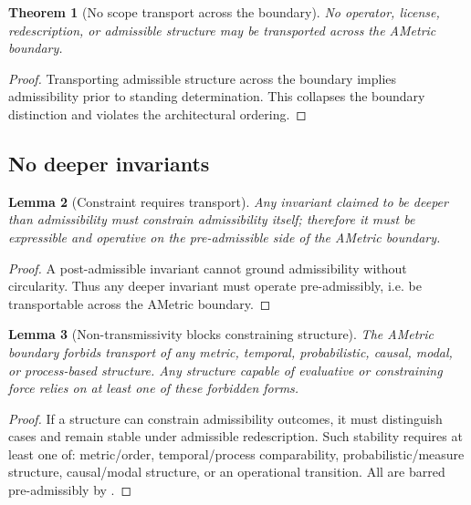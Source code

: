 \documentclass[11pt]{article}
\newtheorem{theorem}{Theorem}[section]
\newtheorem{lemma}[theorem]{Lemma}
\theoremstyle{definition}
\begin{document}
\begin{theorem}[No scope transport across the boundary]
\label{thm:no-scope-transport-boundary}
No operator, license, redescription, or admissible structure may be transported across the AMetric boundary.
\end{theorem}

\begin{proof}
Transporting admissible structure across the boundary implies admissibility prior to standing determination.
This collapses the boundary distinction and violates the architectural ordering.
\end{proof}

\subsection{No deeper invariants}

\begin{lemma}[Constraint requires transport]
\label{lem:constraint-requires-transport}
Any invariant claimed to be \emph{deeper than admissibility} must constrain admissibility itself; therefore it must be expressible and operative on the pre-admissible side of the AMetric boundary.
\end{lemma}

\begin{proof}
A post-admissible invariant cannot ground admissibility without circularity.
Thus any deeper invariant must operate pre-admissibly, i.e. be transportable across the AMetric boundary.
\end{proof}

\begin{lemma}[Non-transmissivity blocks constraining structure]
\label{lem:nontrans-blocks}
The AMetric boundary forbids transport of any metric, temporal, probabilistic, causal, modal, or process-based structure.
Any structure capable of evaluative or constraining force relies on at least one of these forbidden forms.
\end{lemma}

\begin{proof}
If a structure can constrain admissibility outcomes, it must distinguish cases and remain stable under admissible redescription.
Such stability requires at least one of: metric/order, temporal/process comparability, probabilistic/measure structure, causal/modal structure, or an operational transition.
All are barred pre-admissibly by .
\end{proof}
\end{document}
